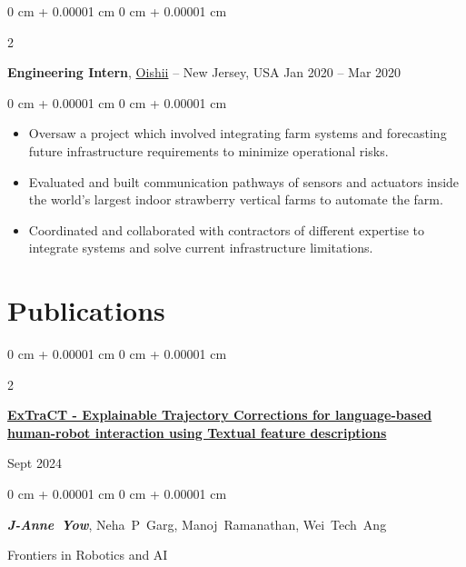 \documentclass[10pt, letterpaper]{article}
\newenvironment{highlights}{
    \begin{itemize}[
        topsep=0.10 cm,
        parsep=0.10 cm,
        partopsep=0pt,
        itemsep=0pt,
        leftmargin=0 cm + 10pt
    ]
}{
    \end{itemize}
} %
\newenvironment{onecolentry}{
    \begin{adjustwidth}{
        0 cm + 0.00001 cm
    }{
        0 cm + 0.00001 cm
    }
}{
    \end{adjustwidth}
} %
\newenvironment{twocolentry}[2][]{
    \onecolentry
    \def\secondColumn{#2}
    \setcolumnwidth{\fill, 4.5 cm}
    \begin{paracol}{2}
}{
    \switchcolumn \raggedleft \secondColumn
    \end{paracol}
    \endonecolentry
} %
\begin{document}
        \vspace{0.2 cm}

        \begin{twocolentry}{
            Jan 2020 – Mar 2020
        }
            \textbf{Engineering Intern}, \href{https://oishii.com/}{Oishii} -- New Jersey, USA\end{twocolentry}

        \vspace{0.10 cm}
        \begin{onecolentry}
            \begin{highlights}
                \item Oversaw a project which involved integrating farm systems and forecasting future infrastructure requirements to minimize operational risks.
                \item Evaluated and built communication pathways of sensors and actuators inside the world's largest indoor strawberry vertical farms to automate the farm.
                \item Coordinated and collaborated with contractors of different expertise to integrate systems and solve current infrastructure limitations.
            \end{highlights}
        \end{onecolentry}



    
    \section{Publications}



        
        \begin{samepage}
            \begin{twocolentry}{
                Sept 2024
            }
                \textbf{\href{https://www.frontiersin.org/journals/robotics-and-ai/articles/10.3389/frobt.2024.1345693/full}{ExTraCT - Explainable Trajectory Corrections for language-based human-robot interaction using Textual feature descriptions}}
            \end{twocolentry}

            \vspace{0.10 cm}
            
            \begin{onecolentry}
                \mbox{\textbf{\textit{J-Anne Yow}}}, \mbox{Neha P Garg}, \mbox{Manoj Ramanathan}, \mbox{Wei Tech Ang}

                \vspace{0.10 cm}
                
        Frontiers in Robotics and AI\end{onecolentry}
        \end{samepage}
\end{document}
